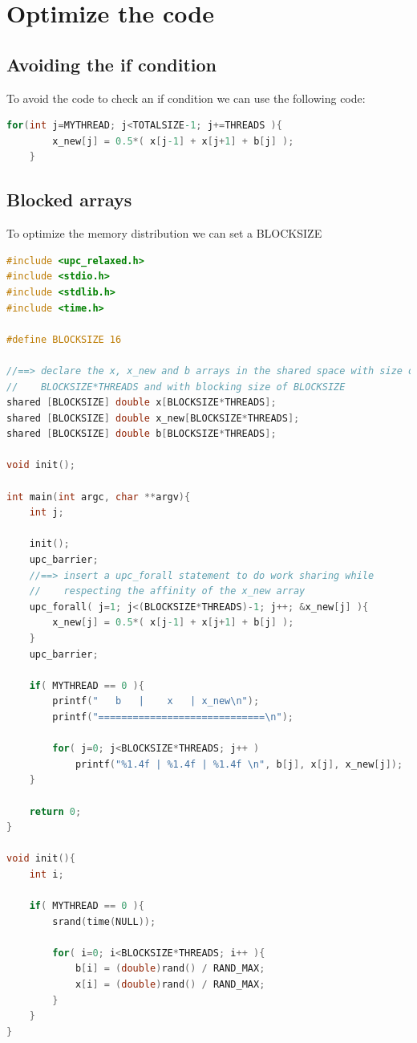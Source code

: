 \documentclass{report}
\begin{document}
\section{Optimize the code}

\subsection{Avoiding the if condition}
To avoid the code to check an if condition we can use the following code:

\begin{lstlisting}[language=C]
    for(int j=MYTHREAD; j<TOTALSIZE-1; j+=THREADS ){
        x_new[j] = 0.5*( x[j-1] + x[j+1] + b[j] );
    }
\end{lstlisting}

\subsection{Blocked arrays}

To optimize the memory distribution we can set a BLOCKSIZE

\begin{lstlisting}[language=C]
#include <upc_relaxed.h>
#include <stdio.h>
#include <stdlib.h>
#include <time.h>

#define BLOCKSIZE 16

//==> declare the x, x_new and b arrays in the shared space with size of 
//    BLOCKSIZE*THREADS and with blocking size of BLOCKSIZE
shared [BLOCKSIZE] double x[BLOCKSIZE*THREADS];
shared [BLOCKSIZE] double x_new[BLOCKSIZE*THREADS];
shared [BLOCKSIZE] double b[BLOCKSIZE*THREADS];

void init();

int main(int argc, char **argv){
    int j;

    init();
    upc_barrier;
    //==> insert a upc_forall statement to do work sharing while 
    //    respecting the affinity of the x_new array
    upc_forall( j=1; j<(BLOCKSIZE*THREADS)-1; j++; &x_new[j] ){
        x_new[j] = 0.5*( x[j-1] + x[j+1] + b[j] );
    }
    upc_barrier;

    if( MYTHREAD == 0 ){
        printf("   b   |    x   | x_new\n");
        printf("=============================\n");

        for( j=0; j<BLOCKSIZE*THREADS; j++ )
            printf("%1.4f | %1.4f | %1.4f \n", b[j], x[j], x_new[j]);
    }

    return 0;
}

void init(){
    int i;

    if( MYTHREAD == 0 ){
        srand(time(NULL));

        for( i=0; i<BLOCKSIZE*THREADS; i++ ){
            b[i] = (double)rand() / RAND_MAX;
            x[i] = (double)rand() / RAND_MAX;
        }
    }
}


\end{lstlisting}
\end{document}
